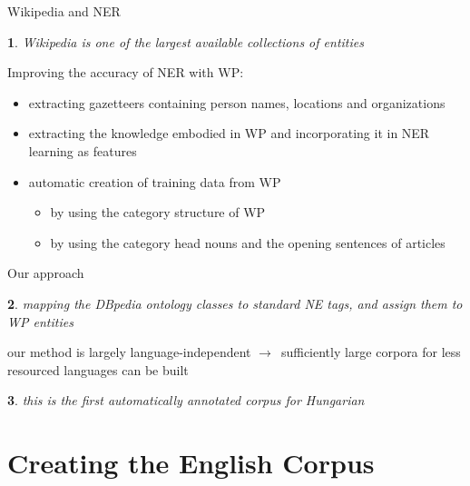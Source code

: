 \documentclass[utf8x,t]{beamer}
\newcommand{\nyil}{$\rightarrow$\ }
\newtheorem{nix}{}[section]
\begin{document}
\begin{frame}{Wikipedia and NER}

\begin{nix}
Wikipedia is one of the largest available collections of entities
\end{nix}

\smallskip

Improving the accuracy of NER with WP:

\begin{itemize}
\item extracting gazetteers containing person names, locations and organizations 
\item extracting the knowledge embodied in WP and incorporating it in NER learning as features
\item automatic creation of training data from WP
\begin{itemize}
\item by using the category structure of WP
\item by using the category head nouns and the opening sentences of articles
\end{itemize} 
\end{itemize}

\end{frame}

\begin{frame}{Our approach}

\begin{nix}
mapping the DBpedia ontology classes to standard NE tags, and assign them to WP entities
\end{nix}

\bigskip

our method is largely language-independent \nyil sufficiently large corpora for less resourced languages can be built 

\bigskip

\begin{nix}
this is the first automatically annotated corpus for Hungarian 
\end{nix}

\end{frame}

\section{Creating the English Corpus}
\end{document}
